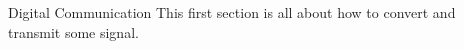 \begin{chapter}{Digital Communication}
This first section is all about how to convert and transmit some signal.
\end{chapter}
